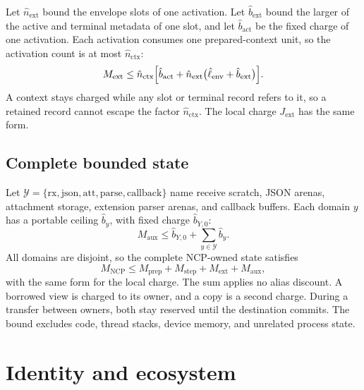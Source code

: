 \documentclass[11pt,a4paper]{article}
\theoremstyle{definition}
\begin{document}
Let $\hat n_{\mathrm{ext}}$ bound the envelope slots of one activation. Let
$\hat b_{\mathrm{ext}}$ bound the larger of the active and terminal metadata of one
slot, and let $\hat b_{\mathrm{act}}$ be the fixed charge of one activation. Each activation consumes one
prepared-context unit, so the activation count is at most $\hat n_{\mathrm{ctx}}$:
\begin{equation}\label{eq:extension-memory}
M_{\mathrm{ext}}\leq\hat n_{\mathrm{ctx}}\Bigl[\hat b_{\mathrm{act}}
+\hat n_{\mathrm{ext}}\bigl(\hat\ell_{\mathrm{env}}+\hat b_{\mathrm{ext}}\bigr)\Bigr].
\end{equation}
A context stays charged while any slot or terminal record refers to it, so a retained
record cannot escape the factor $\hat n_{\mathrm{ctx}}$. The local charge
$J_{\mathrm{ext}}$ has the same form.

\subsection{Complete bounded state}

Let $\mathcal{Y}=\{\mathrm{rx},\mathrm{json},\mathrm{att},\mathrm{parse},
\mathrm{callback}\}$ name receive scratch, JSON arenas, attachment storage, extension
parser arenas, and callback buffers. Each domain $y$ has a portable ceiling
$\hat b_y$, with fixed charge $\hat b_{Y,0}$:
\begin{equation}\label{eq:aux}
M_{\mathrm{aux}}\leq\hat b_{Y,0}+\sum_{y\in\mathcal{Y}}\hat b_y.
\end{equation}
All domains are disjoint, so the complete NCP-owned state satisfies
\begin{equation}\label{eq:total}
M_{\mathrm{NCP}}\leq M_{\mathrm{prep}}+M_{\mathrm{step}}+M_{\mathrm{ext}}
+M_{\mathrm{aux}},
\end{equation}
with the same form for the local charge. The sum applies no alias discount. A borrowed
view is charged to its owner, and a copy is a second charge. During a transfer between
owners, both stay reserved until the destination commits. The bound excludes code,
thread stacks, device memory, and unrelated process state.

\section{Identity and ecosystem}\label{sec:ecosystem}

\end{document}

